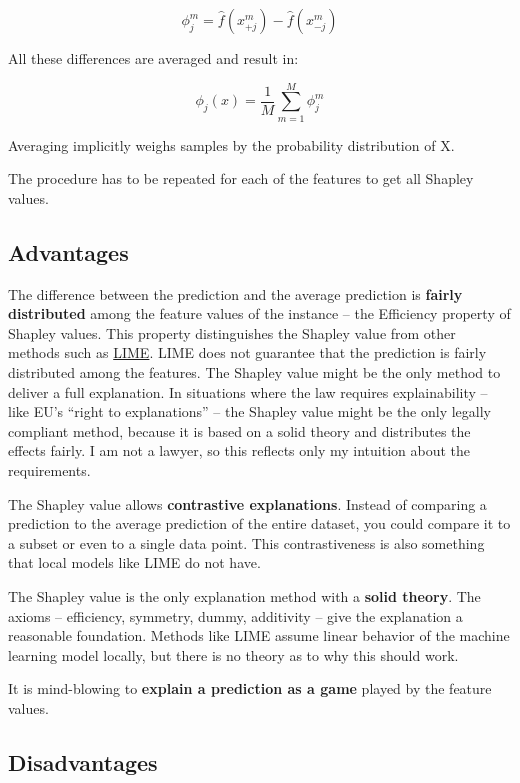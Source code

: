 \documentclass[
  12pt,
]{krantz}
\begin{document}
\[\phi_j^{m}=\hat{f}(x^m_{+j})-\hat{f}(x^m_{-j})\]

All these differences are averaged and result in:

\[\phi_j(x)=\frac{1}{M}\sum_{m=1}^M\phi_j^{m}\]

Averaging implicitly weighs samples by the probability distribution of X.

The procedure has to be repeated for each of the features to get all Shapley values.

\hypertarget{advantages-16}{%
\subsection{Advantages}\label{advantages-16}}

The difference between the prediction and the average prediction is \textbf{fairly distributed} among the feature values of the instance -- the Efficiency property of Shapley values.
This property distinguishes the Shapley value from other methods such as \protect\hyperlink{lime}{LIME}.
LIME does not guarantee that the prediction is fairly distributed among the features.
The Shapley value might be the only method to deliver a full explanation.
In situations where the law requires explainability -- like EU's ``right to explanations'' -- the Shapley value might be the only legally compliant method, because it is based on a solid theory and distributes the effects fairly.
I am not a lawyer, so this reflects only my intuition about the requirements.

The Shapley value allows \textbf{contrastive explanations}.
Instead of comparing a prediction to the average prediction of the entire dataset, you could compare it to a subset or even to a single data point.
This contrastiveness is also something that local models like LIME do not have.

The Shapley value is the only explanation method with a \textbf{solid theory}.
The axioms -- efficiency, symmetry, dummy, additivity -- give the explanation a reasonable foundation.
Methods like LIME assume linear behavior of the machine learning model locally, but there is no theory as to why this should work.

It is mind-blowing to \textbf{explain a prediction as a game} played by the feature values.

\hypertarget{disadvantages-16}{%
\subsection{Disadvantages}\label{disadvantages-16}}
\end{document}
